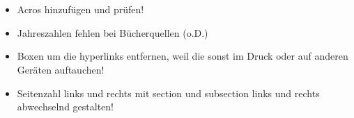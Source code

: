 \newpage
\section*{}
    \begin{itemize}
        \item Acros hinzufügen und prüfen!
        \item Jahreszahlen fehlen bei Bücherquellen (o.D.)
        \item Boxen um die hyperlinks entfernen, weil die sonst im Druck oder auf anderen Geräten auftauchen!
        \item Seitenzahl links und rechts mit section und subsection links und rechts abwechselnd gestalten!
    \end{itemize}